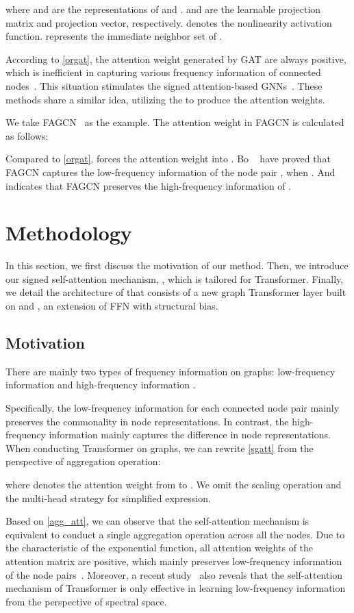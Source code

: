 \documentclass[sigconf, screen]{acmart}
\begin{document}
where  and  are the representations of  and .
 and  are the learnable projection matrix and projection vector, respectively.  denotes the nonlinearity activation function.
 represents the immediate neighbor set of .


According to \autoref{orgat}, the attention weight  generated by GAT are always positive, which is inefficient in capturing various frequency information of connected nodes~\cite{fagcn}.
This situation stimulates the signed attention-based GNNs~\cite{fagcn,sign1,sign2}.
These methods share a similar idea, utilizing the  to produce the attention weights.

We take FAGCN~\cite{fagcn} as the example. The attention weight in FAGCN is calculated as follows:

Compared to \autoref{orgat},  forces the attention weight  into .
Bo \etal~\cite{fagcn} have proved that FAGCN captures the low-frequency information of the node pair , when . And  indicates that FAGCN preserves the high-frequency information of . \section{Methodology}

In this section, we first discuss the motivation of our method.
Then, we introduce our signed self-attention mechanism, \saname, which is tailored for Transformer.
Finally, we detail the architecture of \name that consists of a new graph Transformer layer built on \saname and \sffn, an extension of FFN with structural bias.

\subsection{Motivation}
There are mainly two types of frequency information on graphs: low-frequency information and high-frequency information \cite{fagcn}.

Specifically, the low-frequency information for each connected node pair mainly preserves the commonality in node representations. 
In contrast, the high-frequency information mainly captures the difference in node representations.
When conducting Transformer on graphs, we can rewrite \autoref{sgatt} from the perspective of aggregation operation:

where  denotes the attention weight from  to .
We omit the scaling operation and the multi-head strategy for simplified expression.

Based on \autoref{agg_att}, we can observe that the self-attention mechanism 
is equivalent to conduct a single 
aggregation operation across all the nodes.
Due to the characteristic of the exponential function, all attention weights of the attention matrix  are positive, which mainly preserves low-frequency information of the node pairs~\cite{fagcn}.
Moreover, a recent study~\cite{feta} also reveals that the self-attention mechanism of Transformer is only effective in learning low-frequency information from the perspective of spectral space.
\end{document}

